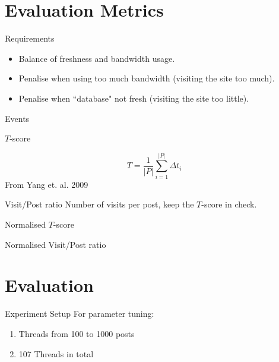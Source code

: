 \documentclass[12pt]{../presentation}
\begin{document}
\section{Evaluation Metrics}
\begin{frame}{Requirements}
	\begin{itemize}
		\item Balance of freshness and bandwidth usage.
		\item Penalise when using too much bandwidth (visiting the site too 
			much).
		\item Penalise when ``database" not fresh (visiting the site too 
			little).
	\end{itemize}
\end{frame}

\begin{frame}{Events}
\begin{center}
	
\end{center}
\end{frame}
\begin{frame}{$T$-score}
\begin{center}
	
\end{center}
\[
	T = \frac{1}{|P|} \sum^{|P|}_{i=1}\Delta t_i
\]
From Yang et. al. 2009
\end{frame}
\begin{frame}{Visit/Post ratio}
	\large
	Number of visits per post, keep the $T$-score in check.
\end{frame}

\begin{frame}{Normalised $T$-score}
	\begin{center}
		
	\end{center}
\end{frame}
\begin{frame}{Normalised Visit/Post ratio}
	\begin{center}
		
	\end{center}
\end{frame}

\section{Evaluation}
\begin{frame}{Experiment Setup}
{\scriptsize
}
For parameter tuning:
\begin{enumerate}
	\item Threads from 100 to 1000 posts
	\item 107 Threads in total
\end{enumerate}
\end{frame}
\end{document}
